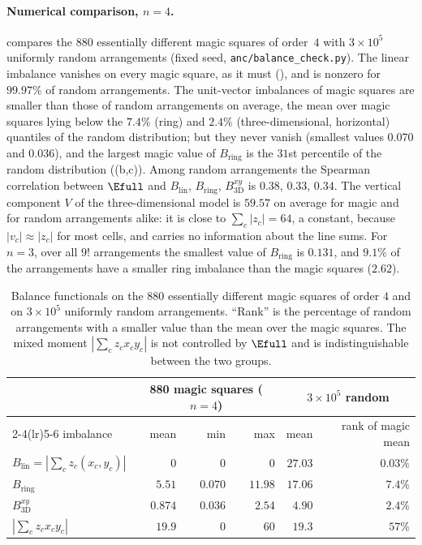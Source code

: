 \paragraph{Numerical comparison, $n=4$.}
 compares the $880$ essentially different magic squares of order~$4$ with $3\times10^5$ uniformly random arrangements (fixed seed, \texttt{anc/balance\_check.py}).
The linear imbalance vanishes on every magic square, as it must (), and is nonzero for $99.97\%$ of random arrangements.
The unit-vector imbalances of magic squares are smaller than those of random arrangements on average, the mean over magic squares lying below the $7.4\%$ (ring) and $2.4\%$ (three-dimensional, horizontal) quantiles of the random distribution; but they never vanish (smallest values $0.070$ and $0.036$), and the largest magic value of $B_{\mathrm{ring}}$ is the $31$st percentile of the random distribution ((b,c)).
Among random arrangements the Spearman correlation between $\Efull$ and $B_{\mathrm{lin}}$, $B_{\mathrm{ring}}$, $B_{3\mathrm D}^{xy}$ is $0.38$, $0.33$, $0.34$.
The vertical component $V$ of the three-dimensional model is $59.57$ on average for magic and for random arrangements alike: it is close to $\sum_c|z_c|=64$, a constant, because $|v_c|\approx|z_c|$ for most cells, and carries no information about the line sums.
For $n=3$, over all $9!$ arrangements the smallest value of $B_{\mathrm{ring}}$ is $0.131$, and $9.1\%$ of the arrangements have a smaller ring imbalance than the magic squares ($2.62$).

\begin{table}[htbp]
\centering
\small
\begin{tabular}{l rrr rr}
\toprule
 & \multicolumn{3}{c}{880 magic squares ($n=4$)} & \multicolumn{2}{c}{$3\times10^5$ random} \\
\cmidrule(lr){2-4}\cmidrule(lr){5-6}
imbalance & mean & min & max & mean & rank of magic mean \\
\midrule
$B_{\mathrm{lin}}=|\sum_cz_c(x_c,y_c)|$ & $0$ & $0$ & $0$ & $27.03$ & $0.03\%$ \\
$B_{\mathrm{ring}}$ & $5.51$ & $0.070$ & $11.98$ & $17.06$ & $7.4\%$ \\
$B^{xy}_{3\mathrm D}$ & $0.874$ & $0.036$ & $2.54$ & $4.90$ & $2.4\%$ \\
$|\sum_cz_cx_cy_c|$ & $19.9$ & $0$ & $60$ & $19.3$ & $57\%$ \\
\bottomrule
\end{tabular}
\caption{Balance functionals on the $880$ essentially different magic squares of order $4$ and on $3\times10^5$ uniformly random arrangements. ``Rank'' is the percentage of random arrangements with a smaller value than the mean over the magic squares. The mixed moment $|\sum_cz_cx_cy_c|$ is not controlled by $\Efull$ and is indistinguishable between the two groups.}
\label{tab:unit_n4}
\end{table}

